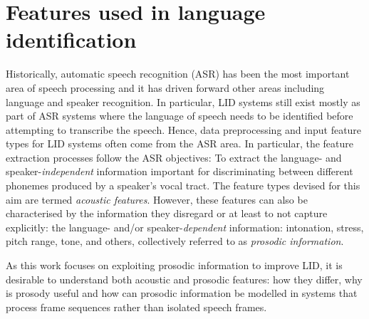 \documentclass[bsc,frontabs,twoside,singlespacing,parskip,deptreport]{infthesis}
\begin{document}
{  \section{Features used in language identification}{
    \label{sec:features}
    Historically, automatic speech recognition (ASR) has been the most important area of speech processing and it has driven forward other areas including language and speaker recognition. In particular, LID systems still exist mostly as part of ASR systems where the language of speech needs to be identified before attempting to transcribe the speech.
    Hence, data preprocessing and input feature types for LID systems often come from the ASR area. In particular, the feature extraction processes follow the ASR objectives: To extract the language- and speaker-\textit{independent} information important for discriminating between different phonemes produced by a speaker's vocal tract. The feature types devised for this aim are termed \textit{acoustic features}.
    However, these features can also be characterised by the information they disregard or at least to not capture explicitly: the language- and/or speaker-\textit{dependent} information: intonation, stress, pitch range, tone, and others, collectively referred to as \textit{prosodic information}.
    
    As this work focuses on exploiting prosodic information to improve LID, it is desirable to understand both acoustic and prosodic features: how they differ, why is prosody useful and how can prosodic information be modelled in systems that process frame sequences rather than isolated speech frames.

}}
\end{document}
